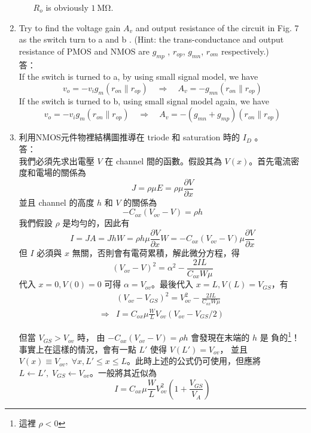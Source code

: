 \documentclass[12pt, a4paper]{article}
\newcommand{\paral}{\mathbin{\|}}
\begin{document}
\begin{enumerate}[itemsep=20pt, topsep=10pt]
\begin{enumerate}[(a)]
        $R_o$ is obviously $\boxed{\SI{1}\Mohm}$.
    \end{enumerate}

  \item {Try to find the voltage gain $A_v$ and output resistance of the circuit in Fig. 7 as the switch turn to a and b .
      (Hint: the trans-conductance and output resistance of PMOS and NMOS are $g_{mp}$ , $r_{op}$, $g_{mn}$, $r_{om}$
      respectively.) } \\[10pt]
    答：\\
    If the switch is turned to a, by using small signal model, we have
    \[ v_o = -v_i g_m \left( r_{on} \paral r_{op} \right) \quad \Rightarrow 
    \quad A_v = \boxed{-g_{mn} \left( r_{on} \paral r_{op} \right)}\]
    If the switch is turned to b, using small signal model again, we have
    \[ v_o = -v_i g_m \left( r_{on} \paral r_{op} \right) \quad \Rightarrow 
    \quad A_v = \boxed{-(g_{mn} + g_{mp}) \left( r_{on} \paral r_{op} \right)}\]

  \item {利用NMOS元件物裡結構圖推導在 triode 和 saturation 時的 $I_D$ 。} \\[10pt]
    答：\\
    我們必須先求出電壓 $V$ 在 channel 間的函數。假設其為 $V(x)$。首先電流密度和電場的關係為
    \[ J = \rho \mu E = \rho \mu \frac{\partial V}{\partial x} \] 
    並且 channel 的高度 $h$ 和 $V$ 的關係為
    \[ -C_{ox} (V_{ov} - V) = \rho h \]
    我們假設 $\rho$ 是均勻的，因此有
    \[ I = J A = J h W = \rho h \mu \frac{\partial V}{\partial x} W = 
     -C_{ox} (V_{ov} - V) \mu \frac{\partial V}{\partial x}\]
    但 $I$ 必須與 $x$ 無關，否則會有電荷累積，解此微分方程，得
    \[ (V_{ov} - V)^2 = \alpha^2 - \frac{2 I L}{C_{ox} W \mu} \]
    代入 $x = 0, V(0) = 0$ 可得 $\alpha = V_{ov}$。最後代入 $x = L, V(L) = V_{GS}$，有
    \begin{align*}
      & (V_{ov} - V_{GS})^2 = V_{ov}^2 - \frac{2 I L}{C_{ox} W \mu} \\
      \Rightarrow & I = C_{ox} \mu \frac{W}{L} V_{ov} (V_{ov} - V_{GS}/2)
    \end{align*}

    但當 $V_{GS} > V_{ov}$ 時， 由 $ -C_{ox} (V_{ov} - V) = \rho h $ 會發現在末端的 $h$ 是
    負的\footnote{這裡 $\rho < 0$}！ 事實上在這樣的情況，會有一點 $L'$ 使得 $V(L') = V_{ov}$，
    並且 $V(x) \equiv V_{ov}, \; \forall x,  L' \leq x \leq L$。此時上述的公式仍可使用，但應將
    $L \leftarrow L', \; V_{GS} \leftarrow V_{ov}$。一般將其近似為
    \[I = C_{ox} \mu \frac{W}{L} V_{ov}^2 \left( 1 + \frac{V_{GS}}{V_{A}} \right) \]
    

\end{enumerate}
\end{document}
